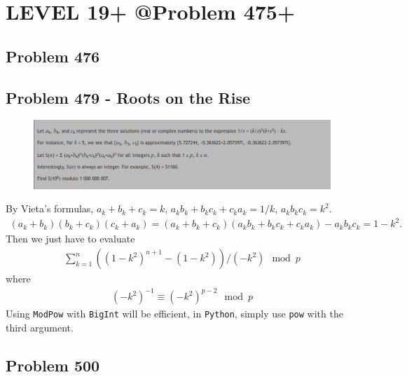 \chapter{LEVEL 19+ @Problem 475+}
\section{Problem 476}
\begin{prob}
\end{prob}

\section{Problem 479 - Roots on the Rise}
\begin{prob}
	\begin{figure}[htb!]
		\begin{center}
			\includegraphics[scale = 0.4]{pic/479.png}
		\end{center}
	\end{figure}
\end{prob}
\begin{sol}
By Vieta's formulas, $a_k + b_k + c_k = k$, $a_kb_k + b_kc_k + c_ka_k = 1/k$, $a_kb_kc_k = k^2$.
\begin{eqnarray}
(a_k + b_k)(b_k + c_k)(c_k + a_k) = (a_k + b_k + c_k)(a_kb_k + b_kc_k + c_ka_k) -a_kb_kc_k = 1 - k^2.
\end{eqnarray}
Then we just have to evaluate
\begin{eqnarray}
\sum_{k = 1}^n ((1 - k^2)^{n + 1} - (1 - k^2))/(- k^2) \mod p
\end{eqnarray}
where 
\begin{eqnarray}
(-k^2)^{-1} \equiv (-k^2)^{p-2} \mod{p}
\end{eqnarray}
Using \texttt{ModPow} with \texttt{BigInt} will be efficient, in \texttt{Python}, simply use \texttt{pow} with the third argument.
\end{sol}
\section{Problem 500}
\begin{prob}
\end{prob}